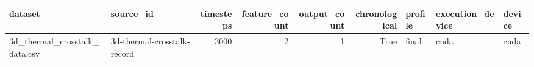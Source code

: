 \begin{tabular}{llrrrrlll}
\toprule
dataset & source\_id & timesteps & feature\_count & output\_count & chronological & profile & execution\_device & device \\
\midrule
3d\_thermal\_crosstalk\_data.csv & 3d-thermal-crosstalk-record & 3000 & 2 & 1 & True & final & cuda & cuda \\
\bottomrule
\end{tabular}
